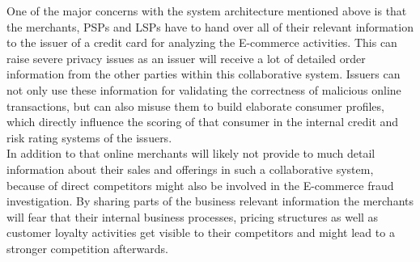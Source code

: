 One of the major concerns with the system architecture mentioned above is that the merchants, \gls{PSP}s and \gls{LSP}s have to hand over all of their relevant information to the issuer of a credit card for analyzing the \gls{E-commerce} activities. This can raise severe privacy issues as an issuer will receive a lot of detailed order information from the other parties within this collaborative system. Issuers can not only use these information for validating the correctness of malicious online transactions, but can also misuse them to build elaborate consumer profiles, which directly influence the scoring of that consumer in the internal credit and risk rating systems of the issuers. \\

In addition to that online merchants will likely not provide to much detail information about their sales and offerings in such a collaborative system, because of direct competitors might also be involved in the \gls{E-commerce} fraud investigation. By sharing parts of the business relevant information the merchants will fear that their internal business processes, pricing structures as well as customer loyalty activities get visible to their competitors and might lead to a stronger competition afterwards. \\




